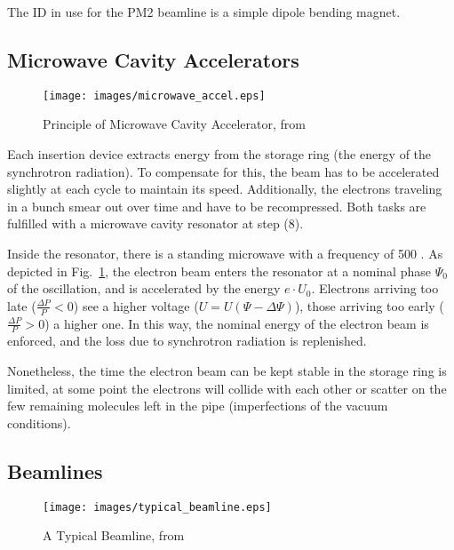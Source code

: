 \documentclass[a4paper,10pt]{article}
\begin{document}
    The ID in use for the PM2 beamline is a simple dipole bending magnet.


    \subsection{Microwave Cavity Accelerators}
    \label{Microwave Cavity Accelerators}

\begin{figure}[htbp]
    \centering
    \texttt{[image: images/microwave\_accel.eps]}
    \caption{Principle of Microwave Cavity Accelerator, from \citep{wille1991}}
  \label{image:microwave_accel}
\end{figure}

    Each insertion device extracts energy from the storage ring (the energy of
the synchrotron radiation). To compensate for this, the beam has to be
accelerated slightly at each cycle to maintain its speed. Additionally, the
electrons traveling in a bunch smear out over time and have to be recompressed.
Both tasks are fulfilled with a microwave cavity resonator at step (8).

    Inside the resonator, there is a standing microwave with a frequency of 500
\mega\hertz. As depicted in Fig.~\ref{image:microwave_accel}, the electron beam
enters the resonator at a nominal phase $\Psi_0$ of the oscillation, and is
accelerated by the energy $e \cdot U_0$. Electrons arriving too late
($\frac{\Delta P}{P} < 0 $) see a higher voltage ($ U = U(\Psi - \Delta \Psi)$),
those arriving too early ($\frac{\Delta P}{P} > 0 $) a higher one. In this way,
the nominal energy of the electron beam is enforced, and the loss due to
synchrotron radiation is replenished.

    Nonetheless, the time the electron beam can be kept stable in the storage
ring is limited, at some point the electrons will collide with each other
or scatter on the few remaining molecules left in the pipe (imperfections of
the vacuum conditions).

    \subsection{Beamlines}
    \label{Beamlines}

\begin{figure}[htbp]
    \centering
    \texttt{[image: images/typical\_beamline.eps]}
    \caption{A Typical Beamline, from
\citep{attwoodlecture}}
  \label{image:typical_beamline}
\end{figure}
\end{document}

